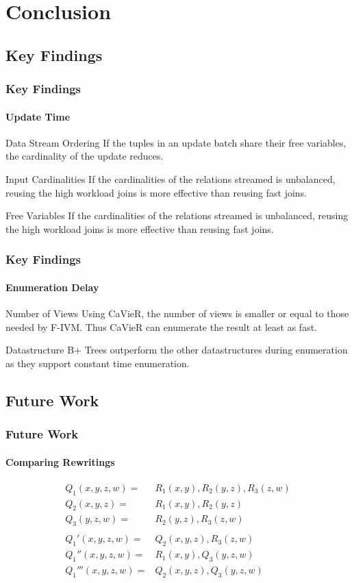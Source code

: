 \documentclass[
	11pt, %
]{beamer}
\begin{document}
\section{Conclusion}
\subsection{Key Findings}
\begin{frame}
	\frametitle{Key Findings}
	\framesubtitle{Update Time}
	\begin{block}{Data Stream Ordering}
		If the tuples in an update batch share their free variables, the cardinality of the update reduces.
	\end{block}
	\begin{block}{Input Cardinalities}
		If the cardinalities of the relations streamed is unbalanced, reusing the high workload joins is more effective than reusing fast joins.
	\end{block}
	\begin{block}{Free Variables}
		If the cardinalities of the relations streamed is unbalanced, reusing the high workload joins is more effective than reusing fast joins.
	\end{block}
\end{frame}

\begin{frame}
	\frametitle{Key Findings}
	\framesubtitle{Enumeration Delay}
	\begin{block}{Number of Views}
		Using CaVieR, the number of views is smaller or equal to those needed by F-IVM. Thus CaVieR can enumerate the result at least as fast.
	\end{block}
	\begin{block}{Datastructure}
		B+ Trees outperform the other datastructures during enumeration as they support constant time enumeration.
	\end{block}
\end{frame}

\subsection{Future Work}
\begin{frame}
	\frametitle{Future Work }
	\framesubtitle{Comparing Rewritings}
	\begin{align*}
		Q_1(x,y,z,w) =&  R_1(x,y), R_2(y,z), R_3(z,w)\\
		Q_2(x,y,z) =&  R_1(x,y), R_2(y,z)\\
		Q_3(y,z,w)=&  R_2(y,z), R_3(z,w)\\\\
		Q_1'(x,y,z,w) =& Q_2(x,y,z), R_3(z,w)\\
		Q_1''(x,y,z,w) =&  R_1(x,y), Q_3(y,z,w)\\
		Q_1'''(x,y,z,w) =&  Q_2(x,y,z), Q_3(y,z,w)
	\end{align*}
\end{frame}
\end{document}
